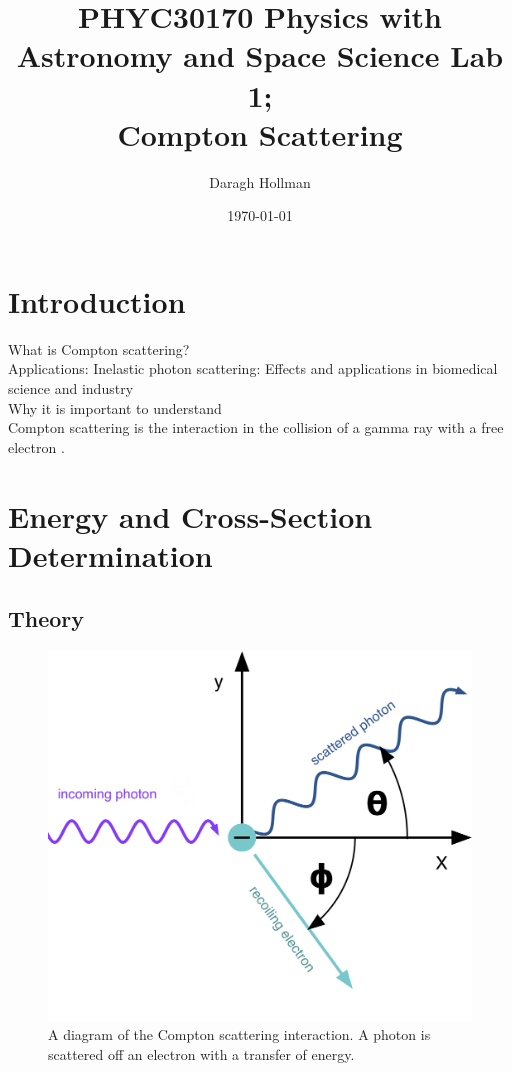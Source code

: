 \documentclass[%
reprint,
amsmath,amssymb,
aps,
]{revtex4-2}
\begin{document}
	
	
	\title{PHYC30170 Physics with Astronomy and Space Science Lab 1;\\Compton Scattering}
	
	\author{Daragh Hollman}
	
	\date{\today}
	
	\begin{abstract}

	\end{abstract}

	\maketitle
	
	\section{Introduction}
	What is Compton scattering?\\
	Applications: Inelastic photon scattering: Effects and applications in biomedical science and industry\cite{harding}\\
	Why it is important to understand\\
	
	Compton scattering is the interaction in the collision of a gamma ray with a free electron \cite{manual1}.
	
	\section{Energy and Cross-Section Determination}
	
		\subsection{Theory}
			

			\begin{figure}
				\includegraphics[width=0.7\columnwidth]{compton_scattering.png}
				\caption{\label{fig:diagram}A diagram of the Compton scattering interaction. A photon is scattered off an electron with a transfer of energy.}
			\end{figure}
		
\end{document}

